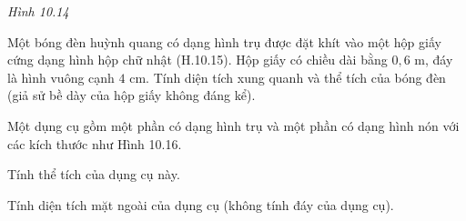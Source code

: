 \begin{exercises}
\begin{questions}[series=SGK]
        \begin{center}

            \textit{Hình 10.14}
        \end{center}

        \answerline
        \answerline
        \answerline

        \item Một bóng đèn huỳnh quang có dạng hình trụ được đặt khít vào một hộp giấy cứng dạng hình hộp chữ nhật (H.10.15). Hộp giấy có chiều dài bằng $0{,}6$ m, đáy là hình vuông cạnh $4$ cm. Tính diện tích xung quanh và thể tích của bóng đèn (giả sử bề dày của hộp giấy không đáng kể).


        \answerline
        \answerline
        \answerline

        \item Một dụng cụ gồm một phần có dạng hình trụ và một phần có dạng hình nón với các kích thước như Hình 10.16.
        \begin{questions}
            \item Tính thể tích của dụng cụ này.
            \item Tính diện tích mặt ngoài của dụng cụ (không tính đáy của dụng cụ).
        \end{questions}


\end{questions}
\end{exercises}
